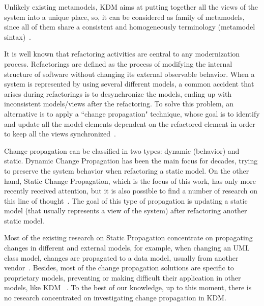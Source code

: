 Unlikely existing metamodels, KDM aims at putting together all the  views of the system into a unique place, so, it can be considered as family of metamodels, since all of them share a consistent and homogeneously terminology (metamodel sintax)~\cite{murduck}. %

It is well known that refactoring activities are central to any modernization process. Refactorings are defined as the process of modifying the internal structure of software without changing its external observable behavior\cite{refactImpro}. When a system is represented by using several different models, a common accident that arises during refactorings is  to desynchronize the models, ending up with inconsistent models/views after the refactoring. To solve this problem, an alternative is to apply a ``change propagation"  technique, whose goal is to identify and update all the model elements dependent on the refactored element in order to keep all the views synchronized~\cite{4440135, Mens:2006:TMT:1706639.1706924, Mens:2006_NEW, Mens:2007}.

Change propagation can be classified in two types: dynamic (behavior) and static. Dynamic  Change Propagation has been the main focus for decades, trying to preserve the system behavior when refactoring a static model. On the other hand, Static Change Propagation, which is the focus of this work, has only more recently received attention, but it is also possible to find a number of research on this line of thought~\cite{4440135, Mens:2006:TMT:1706639.1706924, Mens:2006_NEW, Mens:2007}. The goal of this type of propagation is updating a static model (that usually represents a view of the system) after refactoring another static model.  

Most of the existing research on Static Propagation concentrate on propagating changes in different and external models, for example, when changing an UML class model, changes are propagated to a data model, usually from another vendor~\cite{Supporting_change_propagation_in_UML_models}. Besides, most of the change propagation solutions are specific to proprietary models, preventing or making difficult their application in other models, like KDM ~\cite{4440135, Mens:2007}. To the best of our knowledge, up to this moment, there is no research concentrated on investigating change propagation in KDM.

